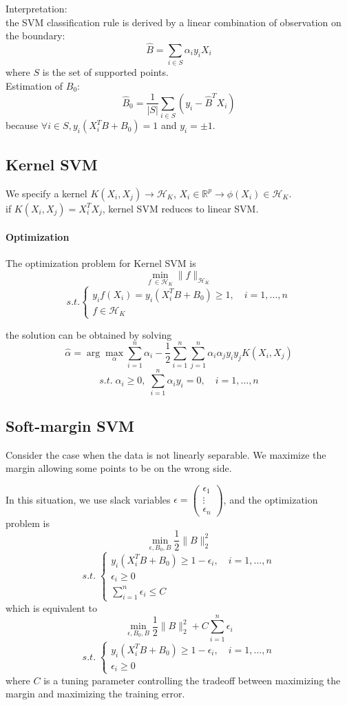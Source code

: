 \documentclass[12pt]{book}
\theoremstyle{definition}
\theoremstyle{remark}
\newcommand{\R}{\mathbb{R}}
\begin{document}
Interpretation: \\
the SVM classification rule is derived by a linear combination of observation on the boundary: $$\hat{B} = \sum_{i\in S}\alpha_iy_iX_i$$ where $S$ is the set of supported points.\\
Estimation of $B_0$: $$\hat{B}_0 = \frac1 {|S|}\sum_{i\in S} (y_i - \hat{B}^TX_i)$$ because $\forall i \in S, y_i(X_i^TB+B_0) = 1$ and $y_i = \pm 1$.



\subsection{Kernel SVM}
We specify a kernel $K(X_i,X_j) \rightarrow \mathcal{H}_K$, $X_i \in \R^p \rightarrow \phi(X_i) \in \mathcal{H}_K$.\\
if $K(X_i,X_j) = X^T_iX_j$, kernel SVM reduces to linear SVM.
\paragraph{Optimization}
The optimization problem for Kernel SVM is 
\[\min_{f\ \in \mathcal{H}_K} \|f\|_{\mathcal{H}_K}\]
\[ s.t. \begin{cases}
    y_if(X_i) = y_i(X_i^TB+B_0) \ge 1, \quad i = 1,\dots,n\\
    f\in \mathcal{H}_K
\end{cases}\]

the solution can be obtained by solving 
\[\hat{\alpha} = \arg\max_{\alpha} \sum_{i=1}^n \alpha_i - \frac12\sum_{i=1}^n\sum_{j=1}^n \alpha_i\alpha_jy_iy_j K(X_i,X_j)\]
\[s.t. \;\alpha_i \ge 0, \; \sum_{i=1}^n\alpha_iy_i = 0,\quad i = 1,\dots,n\]


\subsection{Soft-margin SVM}
Consider the case when the data is not linearly separable. We maximize the margin allowing some points to be on the wrong side.

In this situation, we use slack variables $\epsilon = \begin{pmatrix} \epsilon_1
 \\\vdots
 \\\epsilon_n
\end{pmatrix}$, and the optimization problem is 
\[\min_{\epsilon, B_0,B} \frac12\|B\|_2^2\]
\[s.t.\;
\begin{cases}
    y_i(X_i^TB+B_0)\ge 1 - \epsilon_i, \quad i=1,\dots, n\\
    \epsilon_i \ge 0\\
    \sum_{i=1}^n \epsilon_i \le C
\end{cases}\]
which is equivalent to 
\[\min_{\epsilon, B_0,B} \frac12\|B\|_2^2+C\sum_{i=1}^n\epsilon_i\]
\[s.t.\;
\begin{cases}
    y_i(X_i^TB+B_0)\ge 1 - \epsilon_i, \quad i=1,\dots, n\\
    \epsilon_i \ge 0
\end{cases}\]
 where $C$ is a tuning parameter controlling the tradeoff between maximizing the margin and maximizing the training error.
\end{document}

